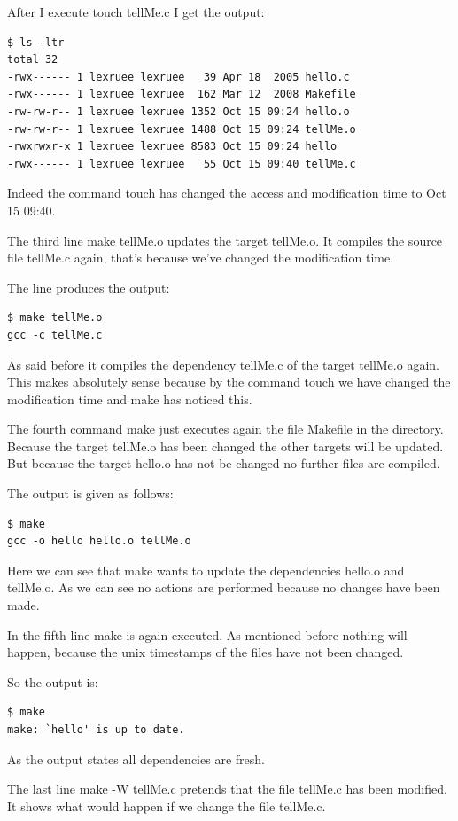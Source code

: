 \documentclass[12pt]{article}
\begin{document}
After I execute touch tellMe.c I get the output:
\begin{lstlisting}
$ ls -ltr
total 32
-rwx------ 1 lexruee lexruee   39 Apr 18  2005 hello.c
-rwx------ 1 lexruee lexruee  162 Mar 12  2008 Makefile
-rw-rw-r-- 1 lexruee lexruee 1352 Oct 15 09:24 hello.o
-rw-rw-r-- 1 lexruee lexruee 1488 Oct 15 09:24 tellMe.o
-rwxrwxr-x 1 lexruee lexruee 8583 Oct 15 09:24 hello
-rwx------ 1 lexruee lexruee   55 Oct 15 09:40 tellMe.c
\end{lstlisting}
Indeed the command touch has changed the access and modification time to Oct 15 09:40.

The third line make tellMe.o updates the target tellMe.o. It compiles the source file tellMe.c again, that's because we've changed the modification time.

The line produces the output:
\begin{lstlisting}
$ make tellMe.o
gcc -c tellMe.c
\end{lstlisting}

As said before it compiles the dependency tellMe.c of the target tellMe.o again. This makes absolutely sense because by the command touch we have changed the modification time and make has noticed this.

The fourth command make just executes again the file Makefile in the directory. Because the target tellMe.o has been changed the other targets will be updated. But because the target hello.o has not be changed no further files are compiled.

The output is given as follows:
\begin{lstlisting}
$ make
gcc -o hello hello.o tellMe.o
\end{lstlisting}

Here we can see that make wants to update the dependencies hello.o and tellMe.o.
As we can see no actions are performed because no changes have been made.

In the fifth line make is again executed. As mentioned before nothing will happen, because the unix timestamps of the files have not been changed. 

So the output is:
\begin{lstlisting}
$ make
make: `hello' is up to date.
\end{lstlisting}

As the output states all dependencies are fresh.

The last line make -W tellMe.c pretends that the file tellMe.c has been modified. It shows what would happen if we change the file tellMe.c. 
\end{document}
